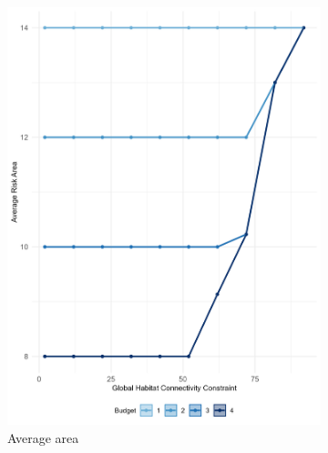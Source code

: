 \begin{figure}
    \centering
    \begin{subfigure}[b]{.48\textwidth}
        \centering
        \includegraphics[height = .4\textheight]{figures/wildland/average_areaF.jpg}
        \caption{Average area}
        \label{fig:area}
    \end{subfigure}
    \hfill
    \begin{subfigure}[b]{.48\textwidth}
        \centering

\end{subfigure}
\end{figure}
